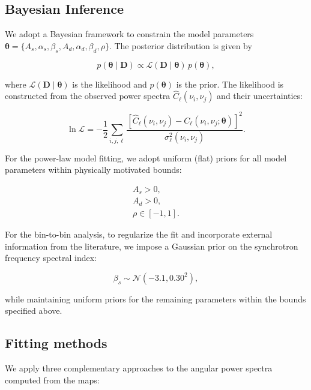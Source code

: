 \subsection{Bayesian Inference}

We adopt a Bayesian framework to constrain the model parameters $\boldsymbol{\theta} = \{A_s, \alpha_s, \beta_s, A_d, \alpha_d, \beta_d, \rho\}$. The posterior distribution is given by

\begin{equation}
p(\boldsymbol{\theta} \mid \mathbf{D}) \propto \mathcal{L}(\mathbf{D} \mid \boldsymbol{\theta}) \, p(\boldsymbol{\theta}),
\end{equation}

where $\mathcal{L}(\mathbf{D} \mid \boldsymbol{\theta})$ is the likelihood and $p(\boldsymbol{\theta})$ is the prior. The likelihood is constructed from the observed power spectra $\hat{C}_\ell(\nu_i, \nu_j)$ and their uncertainties:

\begin{equation}
\ln \mathcal{L} = -\frac{1}{2} \sum_{i,j,\ell} \frac{[\hat{C}_\ell(\nu_i, \nu_j) - C_\ell(\nu_i, \nu_j; \boldsymbol{\theta})]^2}{\sigma^2_\ell(\nu_i, \nu_j)}.
\end{equation}

For the power-law model fitting, we adopt uniform (flat) priors for all model parameters within physically motivated bounds:

\begin{gather*}
A_s > 0, \\
A_d > 0, \\
\rho \in [-1, 1].
\end{gather*}

For the bin-to-bin analysis, to regularize the fit and incorporate external information from the literature, we impose a Gaussian prior on the synchrotron frequency spectral index:

\begin{equation}
\beta_s \sim \mathcal{N}(-3.1, 0.30^2),
\end{equation}

while maintaining uniform priors for the remaining parameters within the bounds specified above.

\subsection{Fitting methods}
\label{sec:fitting_methods}

We apply three complementary approaches to the angular power spectra computed from the maps:

